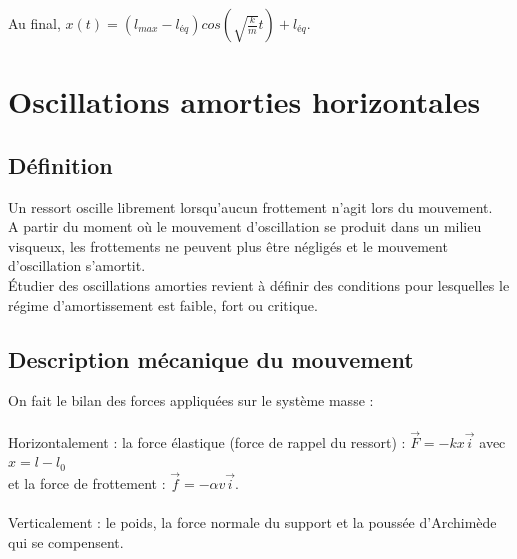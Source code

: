 \documentclass[a4paper,10pt]{book}
\begin{document}
Au final, $x(t)=(l_{max}-l_{éq})cos(\sqrt{\frac{k}{m}} t)+l_{éq}$.

\section{Oscillations amorties horizontales}
\subsection{Définition}
Un ressort oscille librement lorsqu'aucun frottement n'agit lors du mouvement.\\

A partir du moment où le mouvement d'oscillation se produit dans un milieu visqueux, les frottements ne peuvent plus être négligés et le mouvement d'oscillation s'amortit.\\

Étudier des oscillations amorties revient à définir des conditions pour lesquelles le régime d'amortissement est faible, fort ou critique.\\

\begin{center}  \end{center}

\newpage

\subsection{Description mécanique du mouvement}
On fait le bilan des forces appliquées sur le système {masse} :\\\\
Horizontalement : la force élastique (force de rappel du ressort) : $\vec{F}=-kx\vec{i}$ avec $x=l-l_{0}$\\
et la force de frottement : $\vec{f}=-\alpha v\vec{i}$.\\\\
Verticalement : le poids, la force normale du support et la poussée d'Archimède qui se compensent.\\
\end{document}
